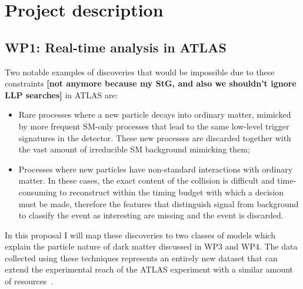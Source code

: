 \documentclass[11pt,a4paper]{article}
\begin{document}
\section{Project description}
\smallskip

\subsection*{WP1: Real-time analysis in ATLAS}




Two notable examples of discoveries that would be impossible due to these constraints \textbf{[not anymore because my StG, and also we shouldn’t ignore LLP searches]} in ATLAS are:
\begin{itemize} 
\item Rare processes where a new particle decays into ordinary matter, mimicked by more frequent SM-only processes that lead to the same low-level trigger signatures in the detector. These new processes are discarded together with the vast amount of irreducible SM background mimicking them;
\item Processes where new particles have non-standard interactions with ordinary matter. In these cases, the exact content of the collision is difficult and time-consuming to reconstruct within the timing budget with which a decision must be made, therefore the features that distinguish signal from background to classify the event as interesting are missing and the event is discarded.
\end{itemize}
In this proposal I will map these discoveries to two classes of models which explain the particle nature of dark matter discussed in WP3 and WP4. The data collected using these techniques represents an entirely new dataset that can extend the experimental reach of the ATLAS experiment with a similar amount of resources~\cite{Resonances}. 
\end{document}
